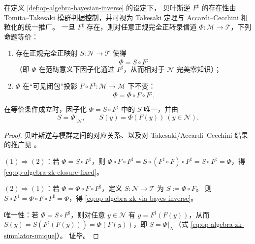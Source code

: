 \begin{theorem}\label{thm:op-algebra-bayes-inverse-zk}
在定义 \ref{def:op-algebra-bayesian-inverse} 的设定下，
贝叶斯逆 \(F^\sharp\) 的存在性由 Tomita--Takesaki 模群判据控制，并可视为 Takesaki 定理与 Accardi--Cecchini 粗粒化的统一推广。
一旦 \(F^\sharp\) 存在，则对任意正规完全正转录信道 \(\Phi:\mathcal{M}\to\mathcal{T}\)，下列命题等价：
\begin{enumerate}
  \item 存在正规完全正映射 \(S:\mathcal{N}\to\mathcal{T}\) 使得
  \begin{equation}\label{eq:op-algebra-zk-via-bayes-inverse}
  \boxed{\;\Phi = S\circ F^\sharp\;}
  \end{equation}
  （即 \(\Phi\) 在范畴意义下因子化通过 \(F^\sharp\)，从而相对于 \(\mathcal{N}\) 完美零知识）；
  \item \(\Phi\) 在“可见闭包”投影 \(F\circ F^\sharp:\mathcal{M}\to\mathcal{M}\) 下不变：
  \begin{equation}\label{eq:op-algebra-zk-closure-fixed}
  \boxed{\;\Phi=\Phi\circ F\circ F^\sharp.\;}
  \end{equation}
\end{enumerate}
在等价条件成立时，因子化 \(\Phi=S\circ F^\sharp\) 中的 \(S\) 唯一，并由
\begin{equation}\label{eq:op-algebra-zk-simulator-unique}
\boxed{\;S=\Phi|_{\mathcal{N}},\qquad S(y)=\Phi(F(y))\ (y\in\mathcal{N}).\;}
\end{equation}
\end{theorem}

\begin{proof}
贝叶斯逆与模群之间的对应关系、以及对 Takesaki/Accardi--Cecchini 结果的推广见 \cite{GiorgettiEtAl2023BayesianInversionModularGroup}。
\par
\((1)\Rightarrow(2)\)：若 \(\Phi=S\circ F^\sharp\)，则
\(
\Phi\circ F\circ F^\sharp=S\circ (F^\sharp\circ F)\circ F^\sharp=S\circ F^\sharp=\Phi
\)，得 \eqref{eq:op-algebra-zk-closure-fixed}。
\par
\((2)\Rightarrow(1)\)：若 \(\Phi=\Phi\circ F\circ F^\sharp\)，定义 \(S:\mathcal{N}\to\mathcal{T}\) 为 \(S:=\Phi\circ F\)。
则
\(
S\circ F^\sharp=\Phi\circ F\circ F^\sharp=\Phi
\)，得 \eqref{eq:op-algebra-zk-via-bayes-inverse}。
\par
唯一性：若 \(\Phi=S\circ F^\sharp\)，则对任意 \(y\in\mathcal{N}\) 有 \(y=F^\sharp(F(y))\)，从而
\(
S(y)=S(F^\sharp(F(y)))=\Phi(F(y))
\)，即 \(S=\Phi|_{\mathcal{N}}\)（式 \eqref{eq:op-algebra-zk-simulator-unique}）。
证毕。
\end{proof}

